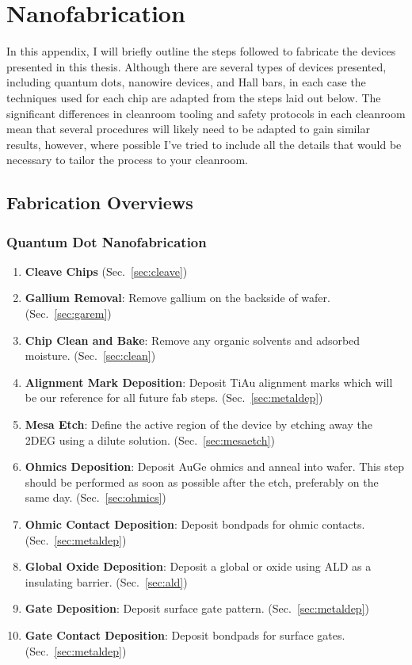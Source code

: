 \chapter{Nanofabrication}
\label{sec:fab}
In this appendix, I will briefly outline the steps followed to fabricate the devices presented in this thesis.
Although there are several types of devices presented, including quantum dots, nanowire devices, and Hall bars,
in each case the techniques used for each chip are adapted from the steps laid out below. The significant differences
in cleanroom tooling and safety protocols in each cleanroom mean that several procedures will likely need to be
adapted to gain similar results, however, where possible I've tried to include all the details that would be necessary
to tailor the process to your cleanroom.

\section{Fabrication Overviews}
\label{sec:fab_overview}

\subsection{Quantum Dot Nanofabrication}
\begin{enumerate}
    \item \textbf{Cleave Chips} (Sec.~\ref{sec:cleave})
    \item \textbf{Gallium Removal}: Remove gallium on the backside of wafer. (Sec.~\ref{sec:garem})
    \item \textbf{Chip Clean and Bake}: Remove any organic solvents and adsorbed moisture. (Sec.~\ref{sec:clean})
    \item \textbf{Alignment Mark Deposition}: Deposit TiAu alignment marks which will be our reference for all future fab steps. (Sec.~\ref{sec:metaldep})
    \item \textbf{Mesa Etch}: Define the active region of the device by etching away the 2DEG using a dilute  solution. (Sec.~\ref{sec:mesaetch})
    \item \textbf{Ohmics Deposition}: Deposit AuGe ohmics and anneal into wafer. This step should be performed as soon as possible after the etch, preferably on the same day. (Sec.~\ref{sec:ohmics})
    \item \textbf{Ohmic Contact Deposition}: Deposit bondpads for ohmic contacts. (Sec.~\ref{sec:metaldep})
    \item \textbf{Global Oxide Deposition}: Deposit a global  or  oxide using ALD as a insulating barrier. (Sec.~\ref{sec:ald})
    \item \textbf{Gate Deposition}: Deposit surface gate pattern. (Sec.~\ref{sec:metaldep})
    \item \textbf{Gate Contact Deposition}: Deposit bondpads for surface gates. (Sec.~\ref{sec:metaldep})
\end{enumerate}

